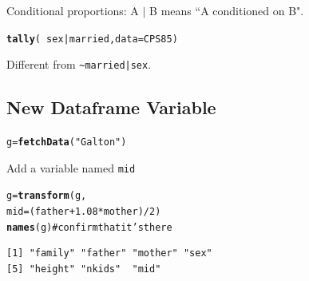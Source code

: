 \documentclass{report}\usepackage{graphicx, color}
\makeatletter
\newcommand{\hlfunctioncall}[1]{\textcolor[rgb]{0.501960784313725,0,0.329411764705882}{\textbf{#1}}}%
\newcommand{\hlstring}[1]{\textcolor[rgb]{0.6,0.6,1}{#1}}%
\newcommand{\hlcomment}[1]{\textcolor[rgb]{0.180392156862745,0.6,0.341176470588235}{#1}}%
\newenvironment{kframe}{%
 \def\at@end@of@kframe{}%
 \ifinner\ifhmode%
  \def\at@end@of@kframe{\end{minipage}}%
  \begin{minipage}{\columnwidth}%
 \fi\fi%
 \def\FrameCommand##1{\hskip\@totalleftmargin \hskip-\fboxsep
 \colorbox{shadecolor}{##1}\hskip-\fboxsep
     \hskip-\linewidth \hskip-\@totalleftmargin \hskip\columnwidth}%
 \MakeFramed {\advance\hsize-\width
   \@totalleftmargin\z@ \linewidth\hsize
   \@setminipage}}%
 {\par\unskip\endMakeFramed%
 \at@end@of@kframe}
\newenvironment{knitrout}{}{} %
\makeatother
\begin{document}
\begin{multicols}{4}
\vspace*{-.1in}
Conditional proportions: A $|$ B means ``A conditioned on B".

\vspace*{-.1in}
\begin{knitrout}
\color{fgcolor}\begin{kframe}
\begin{alltt}
\hlfunctioncall{tally}(~sex | married, data = CPS85)
\end{alltt}
\end{kframe}
\end{knitrout}


\vspace*{-.1in}

Different from \verb+~married|sex+.

\subsection*{New Dataframe Variable}

\vspace*{-.2in}

\begin{knitrout}
\color{fgcolor}\begin{kframe}
\begin{alltt}
g = \hlfunctioncall{fetchData}(\hlstring{"Galton"})
\end{alltt}
\end{kframe}
\end{knitrout}

Add a variable named \texttt{mid}

\vspace*{-.1in}

\begin{knitrout}
\color{fgcolor}\begin{kframe}
\begin{alltt}
g = \hlfunctioncall{transform}(g,
     mid=(father+1.08*mother)/2)
\hlfunctioncall{names}(g)  \hlcomment{#confirm that it's there}
\end{alltt}
\begin{verbatim}
[1] "family" "father" "mother" "sex"   
[5] "height" "nkids"  "mid"   
\end{verbatim}
\end{kframe}
\end{knitrout}



\end{multicols}
\end{document}
